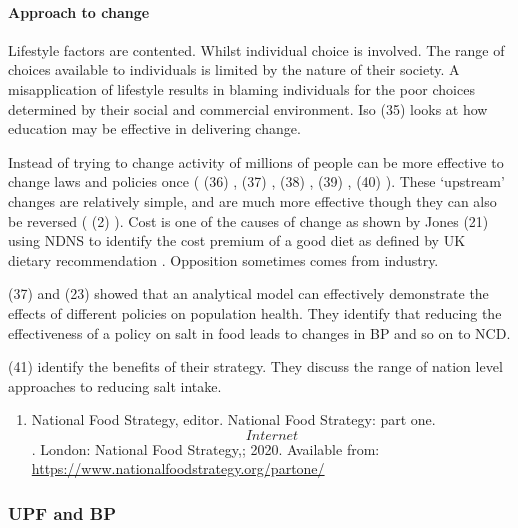 \documentclass[
]{article}
\providecommand{\tightlist}{%
  \setlength{\itemsep}{0pt}\setlength{\parskip}{0pt}}
\begin{document}
\hypertarget{approach-to-change}{%
\paragraph{Approach to change}\label{approach-to-change}}

Lifestyle factors are contented. Whilst individual choice is involved.
The range of choices available to individuals is limited by the nature
of their society. A misapplication of lifestyle results in blaming
individuals for the poor choices determined by their social and
commercial environment. Iso (35) looks at how education may be effective
in delivering change.

Instead of trying to change activity of millions of people can be more
effective to change laws and policies once ( (36) , (37) , (38) , (39) ,
(40) ). These `upstream' changes are relatively simple, and are much
more effective though they can also be reversed ( (2) ). Cost is one of
the causes of change as shown by Jones (21) using NDNS to identify the
cost premium of a good diet as defined by UK dietary recommendation .
Opposition sometimes comes from industry.

(37) and (23) showed that an analytical model can effectively
demonstrate the effects of different policies on population health. They
identify that reducing the effectiveness of a policy on salt in food
leads to changes in BP and so on to NCD.

(41) identify the benefits of their strategy. They discuss the range of
nation level approaches to reducing salt intake.

\begin{enumerate}
\def\labelenumi{\arabic{enumi}.}
\setcounter{enumi}{5}
\tightlist
\item
  National Food Strategy, editor. National Food Strategy: part one.
  \[Internet\]. London: National Food Strategy,; 2020. Available from:
  \url{https://www.nationalfoodstrategy.org/partone/}
\end{enumerate}

\hypertarget{upf-and-bp}{%
\subsubsection{UPF and BP}\label{upf-and-bp}}
\end{document}
